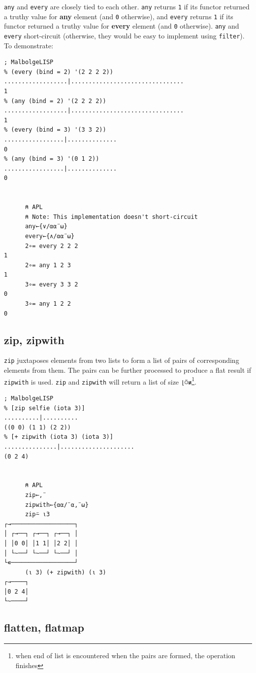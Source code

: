 \par \verb|any| and \verb|every| are closely tied to each other. \verb|any| returns \verb|1| if its functor returned a truthy value for \textbf{any} element (and \verb|0| otherwise), and \verb|every| returns \verb|1| if its functor returned a truthy value for \textbf{every} element (and \verb|0| otherwise). \verb|any| and \verb|every| short-circuit (otherwise, they would be easy to implement using \verb|filter|). To demonstrate:

\begin{verbatim}
; MalbolgeLISP
% (every (bind = 2) '(2 2 2 2))
..................|................................
1
% (any (bind = 2) '(2 2 2 2))
..................|................................
1
% (every (bind = 3) '(3 3 2))
.................|..............
0
% (any (bind = 3) '(0 1 2))
.................|..............
0


      ⍝ APL
      ⍝ Note: This implementation doesn't short-circuit
      any←{∨/⍺⍺¨⍵}
      every←{∧/⍺⍺¨⍵}
      2∘= every 2 2 2
1
      2∘= any 1 2 3
1
      3∘= every 3 3 2
0
      3∘= any 1 2 2
0
\end{verbatim}

\subsection{zip, zipwith}

\par \verb|zip| juxtaposes elements from two lists to form a list of pairs of corresponding elements from them. The pairs can be further processed to produce a flat result if \verb|zipwith| is used. \verb|zip| and \verb|zipwith| will return a list of size \verb|⌊⍥≢|\footnote{when end of list is encountered when the pairs are formed, the operation finishes}.

\begin{verbatim}
; MalbolgeLISP
% [zip selfie (iota 3)]
..........|..........
((0 0) (1 1) (2 2))
% [+ zipwith (iota 3) (iota 3)]
...............|.....................
(0 2 4)


      ⍝ APL
      zip←,¨
      zipwith←{⍺⍺/¨⍺,¨⍵}
      zip⍨ ⍳3
┌→──────────────────┐
│ ┌→──┐ ┌→──┐ ┌→──┐ │
│ │0 0│ │1 1│ │2 2│ │
│ └~──┘ └~──┘ └~──┘ │
└∊──────────────────┘
      (⍳ 3) (+ zipwith) (⍳ 3)
┌→────┐
│0 2 4│
└~────┘
\end{verbatim}

\subsection{flatten, flatmap}

